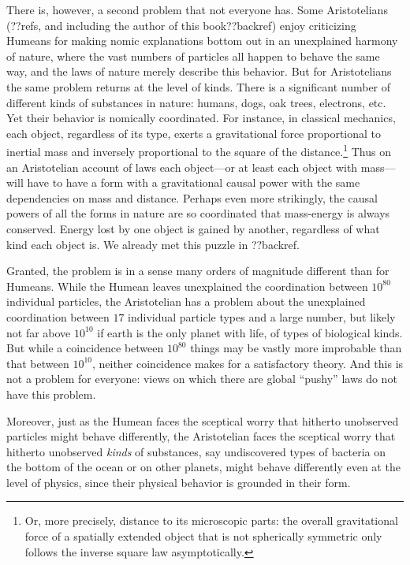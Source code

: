 There is, however, a second problem that not everyone has. Some Aristotelians (??refs, and including the author of this book??backref) 
enjoy criticizing Humeans for making 
nomic explanations bottom out in an unexplained harmony of nature, where the vast numbers of particles all 
happen to behave the same way, and the laws of nature merely describe this behavior. But for Aristotelians the same problem returns 
at the level of kinds. There is a significant number of different kinds of 
substances in nature: humans, dogs, oak trees, electrons, etc. Yet their behavior is nomically coordinated. For instance,
in classical mechanics, each object, regardless of its type, exerts a gravitational force proportional to inertial mass
and inversely proportional to the square of the distance.\footnote{Or, more precisely, distance to its microscopic parts: the overall
gravitational force of a spatially extended object that is not spherically symmetric only follows the inverse square law 
asymptotically.}  Thus on an Aristotelian account of laws each object---or at 
least each object with mass---will have to have a form with a gravitational causal power with the same dependencies on 
mass and distance. Perhaps even more strikingly, the causal powers of all the forms in nature are so coordinated that 
mass-energy is always conserved. Energy lost by one object is gained by another, regardless of what kind each object 
is. We already met this puzzle in ??backref.

Granted, the problem is in a sense many orders of magnitude different than for Humeans. While the Humean leaves 
unexplained the coordination between $10^{80}$ individual particles, the Aristotelian has a problem about the 
unexplained coordination between $17$ individual particle types and a large number, but likely not far above $10^{10}$
if earth is the only planet with life, of types of biological kinds. But while a coincidence between $10^{80}$ things
may be vastly more improbable than that between $10^{10}$, neither coincidence makes for a satisfactory theory.
And this is not a problem for everyone: views on which there are global ``pushy'' laws do not have this problem. 

Moreover, just as the Humean faces the sceptical worry that hitherto unobserved particles might behave differently, 
the Aristotelian faces the sceptical worry that hitherto unobserved \textit{kinds} of substances, say undiscovered 
types of bacteria on the bottom of the ocean or on other planets, might behave differently even at the level of physics, 
since their physical behavior is grounded in their form. 

